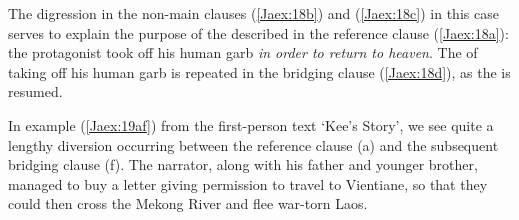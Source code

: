 \documentclass[output=paper]{LSP/langsci}
\begin{document}
\noindent
The digression in the non-main clauses (\ref{Jaex:18b}) and (\ref{Jaex:18c}) in this case serves to explain the purpose of the  described in the reference clause (\ref{Jaex:18a}): the protagonist took off his human garb \textit{in order to return to heaven}. The  of taking off his human garb is repeated in the bridging clause (\ref{Jaex:18d}), as the  is resumed.
 
In example (\ref{Jaex:19af}) from the first-person  text `Kee’s Story', we see quite a lengthy diversion occurring between the reference clause (a) and the subsequent bridging clause (f). The narrator, along with his father and younger brother, managed to buy a letter giving permission to travel to Vientiane, so that they could then cross the Mekong River and flee war-torn Laos.
 
\end{document}
